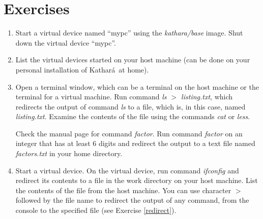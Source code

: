 \documentclass[12pt]{book}
\newcommand{\kathara}{Kathar\'a}
\begin{document}
\section{Exercises}

\begin{enumerate}
\item Start a virtual device named ``mypc'' using the \emph{kathara/base} image. Shut down the virtual device ``mypc''.
\item List the virtual devices started on your host machine (can be done on your personal installation of \kathara\ at home).
\item\label{redirect} Open a terminal window, which can be a terminal
  on the host machine or the terminal for a virtual machine. Run
  command \emph{ls $>$ listing.txt}, which redirects the output of command \emph{ls} to a file, which is, in this case, named \emph{listing.txt}. Examine the contents of the file using the commands \emph{cat} or \emph{less}. 

Check the manual page for command \emph{factor}. Run command \emph{factor} on an integer that has at least 6 digits and redirect the output to a text file named \emph{factors.txt} in your home directory. 

\item Start a virtual device. On the virtual device, run command \emph{ifconfig} and redirect its contents to a file in the work directory on your host machine. List the contents of the file from the host machine. You can use character $>$ followed by the file name to redirect the output of any command, from the console to the specified file (see Exercise \ref{redirect}).


\end{enumerate}
\end{document}
